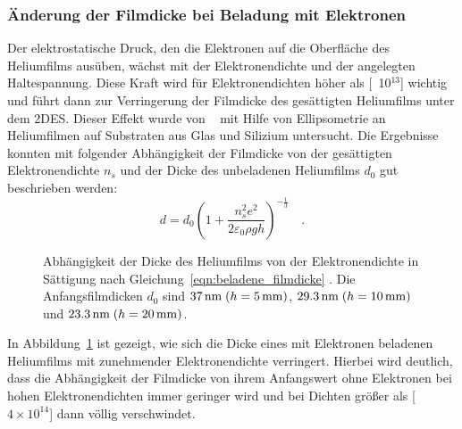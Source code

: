 \subsubsection{Änderung der Filmdicke bei Beladung mit Elektronen}

Der elektrostatische Druck, den die Elektronen auf die Oberfläche des Heliumfilms ausüben, wächst mit der Elektronendichte und der angelegten Haltespannung. Diese Kraft wird für Elektronendichten höher als \unit[10$^{13}$]{\Em} wichtig und führt dann zur Verringerung der Filmdicke des gesättigten Heliumfilms unter dem 2DES. Dieser Effekt wurde von  \ea~\cite{Etz84} mit Hilfe von Ellipsometrie an Heliumfilmen auf Substraten aus Glas und Silizium untersucht. Die Ergebnisse konnten mit folgender Abhängigkeit der Filmdicke von der gesättigten Elektronendichte $n_s$ und der Dicke des unbeladenen Heliumfilms $d_0$ gut beschrieben werden:
    \begin{equation}
        \label{eqn:beladene_filmdicke}
        d = d_0\left(1+\frac{n_s^2 e^2}{2\varepsilon_0\rho g h}\right)^{-\frac13}\quad.
    \end{equation}

\begin{figure}[h!tbp]
    \begin{center}
        \begin{minipage}[b]{\smallwidth}
        \end{minipage}
        \hfill
        \begin{minipage}[b]{\textwidth-\smallwidth-\tabcolsep}
            \caption[Beeinflussung der Filmdicke durch die Elektronendichte.]{Abhängigkeit der Dicke des Heliumfilms von der Elektronendichte in Sättigung nach Gleichung~\eqref{eqn:beladene_filmdicke} \cite{Etz84}. Die Anfangsfilmdicken $d_0$ sind $\unit[37]{nm}\;(h=\unit[5]{mm})$, $\unit[29.3]{nm}\;(h=\unit[10]{mm})$ und $\unit[23.3]{nm}\;(h=\unit[20]{mm})$.}\label{fig:filmdicke_elektronendichte}
        \end{minipage}
    \end{center}
\end{figure}

In Abbildung~\ref{fig:filmdicke_elektronendichte} ist gezeigt, wie sich die Dicke eines mit Elektronen beladenen Heliumfilms mit zunehmender Elektronendichte verringert. Hierbei wird deutlich, dass die Abhängigkeit der Filmdicke von ihrem Anfangswert ohne Elektronen bei hohen Elektronendichten immer geringer wird und bei Dichten größer als \unit[$4\times10^{14}$]{\Em} dann völlig verschwindet.

